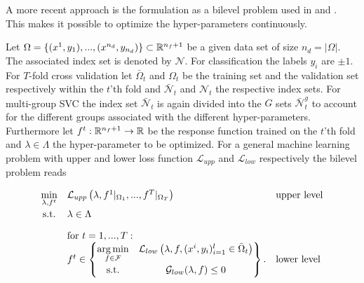 
A more recent approach is the formulation as a bilevel problem used in \cite{Kunapuli2008} and \cite{Moore2011}.
This makes it possible to optimize the hyper-parameters continuously.


Let \(\Omega = \{(x^1,y_1),...,(x^{n_d},y_{n_d})\} \subset \mathbb{R}^{n_f+1}\) be a given data set of size \(n_d = |\Omega|\). The associated index set is denoted by \(\mathcal{N}\). For classification the labels \(y_i\) are \(\pm1\).
For \(T\)-fold cross validation let \(\bar{\Omega}_t\) and \(\Omega_t\) be the training set and the validation set respectively within the \(t\)'th fold and \(\bar{\mathcal{N}}_t\) and \(\mathcal{N}_t\) the respective index sets. For multi-group SVC the index set \(\bar{\mathcal{N}}_t\) is again divided into the \(G\) sets \(\bar{\mathcal{N}}_t^g\) to account for the different groups associated with the different hyper-parameters.
Furthermore let \(f^t:\mathbb{R}^{n_f+1} \to \mathbb{R}\) be the response function trained on the \(t\)'th fold and \(\lambda \in \Lambda\) the hyper-parameter to be optimized.
For a general machine learning problem with upper and lower loss function \(\mathcal{L}_{upp}\) and \(\mathcal{L}_{low}\) respectively the bilevel problem reads
 

\begin{equation*}
	\begin{array}{cll}
	\displaystyle\min_{\lambda, f^t} & \mathcal{L}_{upp}\left(\lambda,f^1|_{\Omega_1},...,f^T|_{\Omega_T}\right) & \text{upper level} \vspace{0.5ex}\\
	\text{s.t.} & \lambda \in \Lambda & \vspace{1em}\\
	& \text{for } t = 1,...,T: & \\
	& f^t \in \begin{Bmatrix} \displaystyle\argmin_{f\in \mathcal{F}} & \mathcal{L}_{low}\left(\lambda,f,(x^i,y_i)_{i = 1}^l\in \bar{\Omega}_t\right) \vspace{0.5ex}\\
	                        \text{s.t.} & \mathcal{G}_{low}(\lambda,f) \leq 0 
													\end{Bmatrix}. & \text{lower level}
	\end{array}
\end{equation*}

